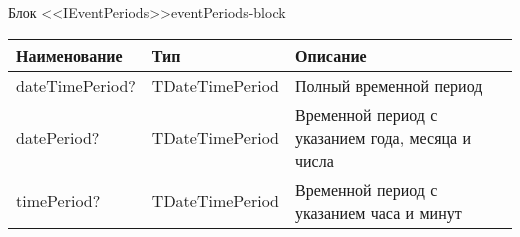 \begin{tbl}{Блок <<IEventPeriods>>}{eventPeriods-block}
  \begin{tabularx}{\textwidth}{| p{3cm} | p{6cm} | X |}
  \hline Наименование    & Тип             & Описание                                          \\
  \hline dateTimePeriod? & TDateTimePeriod & Полный временной период                           \\
  \hline datePeriod?     & TDateTimePeriod & Временной период с указанием года, месяца и числа \\
  \hline timePeriod?     & TDateTimePeriod & Временной период с указанием часа и минут         \\
  \hline
  \end{tabularx}
\end{tbl}

\clearpage